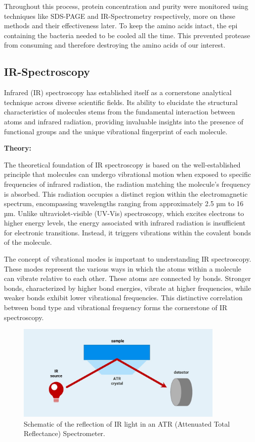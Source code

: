 Throughout this process, protein concentration and purity were monitored using techniques
like SDS-PAGE and IR-Spectrometry respectively, more on these methods and their
effectiveness later.
To keep the amino acids intact, the epi containing the bacteria needed to be cooled all the time.
This prevented protease from consuming and therefore destroying the amino acids of our interest.

\newpage

\subsection{IR-Spectroscopy}
Infrared (IR) spectroscopy has established itself as a cornerstone analytical technique across diverse scientific fields.
Its ability to elucidate the structural characteristics of molecules stems from the fundamental interaction between atoms and infrared radiation, providing invaluable insights into the presence of functional groups and the unique vibrational fingerprint of each molecule.

\textbf{Theory:}

The theoretical foundation of IR spectroscopy is based on the well-established principle that molecules can undergo vibrational motion when exposed to specific frequencies of infrared radiation, the radiation matching the molecule's frequency is absorbed.
This radiation occupies a distinct region within the electromagnetic spectrum, encompassing wavelengths ranging from approximately 2.5 µm to 16 µm.
Unlike ultraviolet-visible (UV-Vis) spectroscopy, which excites electrons to higher energy levels, the energy associated with infrared radiation is insufficient for electronic transitions.
Instead, it triggers vibrations within the covalent bonds of the molecule.

The concept of vibrational modes is important to understanding IR spectroscopy.
These modes represent the various ways in which the atoms within a molecule can vibrate relative to each other.
These atoms are connected by bonds.
Stronger bonds, characterized by higher bond energies, vibrate at higher frequencies, while weaker bonds exhibit lower vibrational frequencies.
This distinctive correlation between bond type and vibrational frequency forms the cornerstone of IR spectroscopy.

\begin{figure}[H]
    \centering
    \includegraphics[width=0.9\textwidth]{./media/images/ir_spectrometer}
    \caption{Schematic of the reflection of IR light in an ATR (Attenuated Total Reflectance) Spectrometer.}
    \label{fig:ir_spectrometer}
\end{figure}

